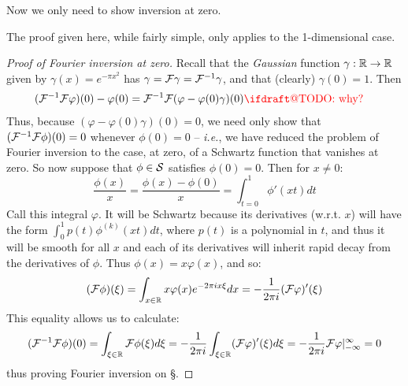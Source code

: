     Now we only need to show inversion at zero.
    \begin{rmk}
      The proof given here, while fairly simple, only applies to the 1-dimensional case. 
    \end{rmk}
    \begin{proof}[Proof of Fourier inversion at zero]
      Recall that the \emph{Gaussian} function $\gamma:\R\rightarrow\R$ given by $\gamma(x) = e^{-\pi x^2}$ has $\gamma=\F\gamma=\F^{-1}\gamma$, and that (clearly) $\gamma(0)=1$.
      Then 
      \begin{align*}
        (\F^{-1}\F\varphi)(0) - \varphi(0) &= \F^{-1}\F(\varphi-\varphi(0)\gamma)(0) \text{\todo{why?}}
      \end{align*}
      Thus, because $(\varphi-\varphi(0)\gamma)(0)=0$, we need only show that $(\F^{-1}\F\phi)(0) = 0$ whenever $\phi(0)=0$ -- \emph{i.e.}, we have reduced the problem of Fourier inversion to the case, at zero, of a Schwartz function that vanishes at zero.
      So now suppose that $\phi\in\S$ satisfies $\phi(0)=0$. 
      Then for $x\ne0$:
      \begin{equation*}
        \frac{\phi(x)}{x} = \frac{\phi(x)-\phi(0)}{x} = \int_{t=0}^1 \phi'(xt)dt
      \end{equation*}
      Call this integral $\varphi$.
      It will be Schwartz because its derivatives (w.r.t. $x$) will have the form $\int_0^1 p(t)\phi^{(k)}(xt)dt$, where $p(t)$ is a polynomial in $t$, and thus it will be smooth for all $x$ and each of its derivatives will inherit rapid decay from the derivatives of $\phi$.
      Thus $\phi(x) = x\varphi(x)$, and so:
      \begin{equation*}
        (\F\phi)(\xi) = \int_{x\in\R} x\varphi(x)e^{-2\pi i x \xi}dx = -\frac{1}{2\pi i}(\F\varphi)'(\xi)
      \end{equation*}
      This equality allows us to calculate:
      \begin{equation*}
        (\F^{-1}\F\phi)(0) = \int_{\xi\in\R} \F\phi(\xi)d\xi = -\frac{1}{2\pi i}\int_{\xi\in\R} (\F\varphi)'(\xi)d\xi = -\frac{1}{2\pi i} \F\varphi\vert_{-\infty}^\infty = 0
      \end{equation*}
      thus proving Fourier inversion on \S.
    \end{proof}

